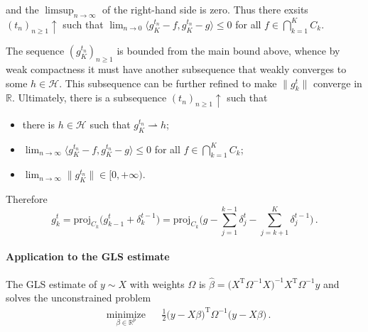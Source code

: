 \documentclass[a4paper]{article}
\newcommand{\Hcal}{\mathcal{H}}
\newcommand{\real}{\mathbb{R}}
\newcommand{\T}{\mathrm{T}}
\begin{document}
and the $\limsup_{n\to \infty}$ of the right-hand side is zero. Thus there exsits
$(t_n)_{n\geq1} \uparrow$ such that $\lim_{n\to 0} \langle g^{t_n}_K - f, g^{t_n}_K - g
\rangle \leq 0$ for all $f\in \bigcap_{k=1}^K C_k$.

The sequence $(g^{t_n}_K)_{n\geq 1}$ is bounded from the main bound above, whence
by weak compactness it must have another subsequence that weakly converges to some
$h\in \Hcal$. This subsequence can be further refined to make $\|g^t_k\|$ converge
in $\real$. Ultimately, there is a subsequence $(t_n)_{n\geq1}\uparrow$ such that
\begin{itemize}
  \item there is $h\in \Hcal$ such that $g^{t_n}_K \rightharpoonup h$;
  \item $\lim_{n\to \infty} \langle g^{t_n}_K - f, g^{t_n}_K - g \rangle \leq 0$
  for all $f\in \bigcap_{k=1}^K C_k$;
  \item $\lim_{n \to \infty} \|g^{t_n}_K\| \in [0, +\infty)$.
\end{itemize}

Therefore
\begin{equation*}
  g^t_k
    = \mathrm{proj}_{C_k}\bigl(
      g^t_{k-1} + \delta^{t-1}_k
    \bigr)
    = \mathrm{proj}_{C_k}\biggl(
      g - \sum_{j=1}^{k-1} \delta^t_j - \sum_{j=k+1}^K \delta^{t-1}_j
    \biggr)
    \,.
\end{equation*}


\paragraph{Application to the GLS estimate} %
\label{par:application_to_the_gls_estimate}

The GLS estimate of $y\sim X$ with weights $\Omega$ is $\hat{\beta} = \bigl(X^\T \Omega^{-1} X
\bigr)^{-1} X^\T \Omega^{-1} y$ and solves the unconstrained problem
\begin{equation} \label{eq:gls_unc}
  \begin{aligned}
    & \underset{\beta\in \real^p}{\text{minimize}}
      & & \tfrac12 \bigl(y - X \beta\bigr)^\T \Omega^{-1} \bigl(y - X \beta\bigr)
          \,.
  \end{aligned}
\end{equation}
\end{document}
